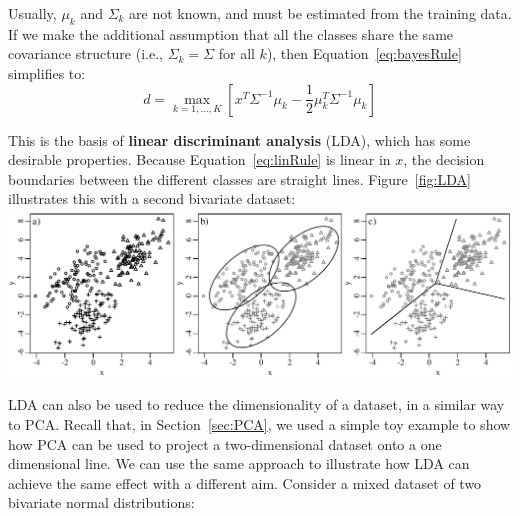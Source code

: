 Usually, $\mu_k$ and $\Sigma_k$ are not known, and must be estimated
from the training data.  If we make the additional assumption that all
the classes share the same covariance structure (i.e., $\Sigma_k =
\Sigma$ for all $k$), then Equation~\ref{eq:bayesRule} simplifies to:
\begin{equation}
  \label{eq:linRule}
d = \underset{k=1,\ldots,K}{\max}\left[
x^T\Sigma^{-1}\mu_k-\frac{1}{2}\mu_k^T\Sigma^{-1}\mu_k \right]
\end{equation}

This is the basis of \textbf{linear discriminant analysis} (LDA),
which has some desirable properties.  Because
Equation~\ref{eq:linRule} is linear in $x$, the decision boundaries
between the different classes are straight lines. Figure~\ref{fig:LDA}
illustrates this with a second bivariate dataset:\\

\noindent\includegraphics[width=\linewidth]{../figures/LDA.pdf}
\begingroup {}
\label{fig:LDA}
\endgroup

LDA can also be used to reduce the dimensionality of a dataset, in a
similar way to PCA. Recall that, in Section~\ref{sec:PCA}, we used a
simple toy example to show how PCA can be used to project a
two-dimensional dataset onto a one dimensional line. We can use the
same approach to illustrate how LDA can achieve the same effect with a
different aim. Consider a mixed dataset of two bivariate normal
distributions:\\

